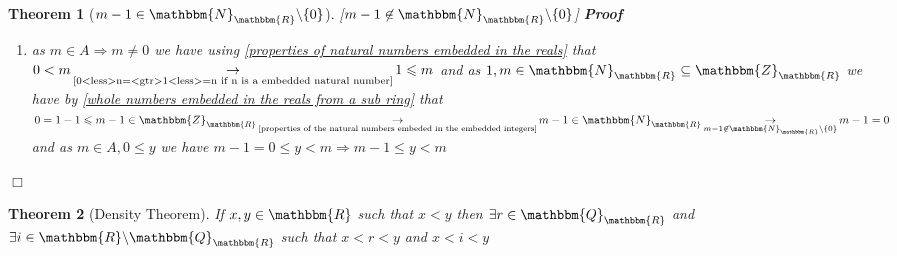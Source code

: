 \documentclass{book}
\newcommand{\Rightarrowlim}{\mathop{\rightarrow}\limits}
\newcommand{\nin}{\not\in}
\newcommand{\um}{-}
\newenvironment{proof}{\noindent\textbf{Proof\ }}{\hspace*{\fill}$\Box$\medskip}
\newtheorem{theorem}{Theorem}
\begin{document}
{{\begin{theorem}[$m \um 1 \in \mathbbm{N}_{\mathbbm{R}} \backslash \{ 0 \}$][$m
\um 1 \nin \mathbbm{N}_{\mathbbm{R}} \backslash \{ 0 \}$]
\begin{proof}
\begin{enumerate}
\begin{enumerate}
        \item as $m \in A \Rightarrow m \neq 0$ we have using \ref{properties
        of natural numbers embedded in the reals} that $0 < m
        \Rightarrowlim_{\text{\ref{0<less>n=<gtr>1<less>=n if n is a embedded
        natural number}}} 1 \leqslant m$ and as $1, m \in
        \mathbbm{N}_{\mathbbm{R}} \subseteq \mathbbm{Z}_{\mathbbm{R}}$ we have
        by \ref{whole numbers embedded in the reals from a sub ring} that $0 =
        1 \um 1 \leqslant m \um 1 \in \mathbbm{Z}_{\mathbbm{R}}
        \Rightarrowlim_{\text{\ref{properties of the natural numbers embeded
        in the embedded integers}}} m \um 1 \in \mathbbm{N}_{\mathbbm{R}}
        \Rightarrowlim_{m \um 1 \nin \mathbbm{N}_{\mathbbm{R}} \backslash \{ 0
        \}} m \um 1 = 0$ and as $m \in A, 0 \leqslant y$ we have $m \um 1 = 0
        \leqslant y < m \Rightarrow m - 1 \leqslant y < m$
      \end{enumerate}
    \end{enumerate}
  \end{proof}
\end{theorem}

\begin{theorem}[Density Theorem]
  \label{density theorem for the reals}{}If $x, y \in
  \mathbbm{R}$ such that $x < y$ then $\exists r \in
  \mathbbm{Q}_{\mathbbm{R}}$ and $\exists i \in \mathbbm{R} \backslash
  \mathbbm{Q}_{\mathbbm{R}}$ such that $x < r < y$ and $x < i < y$
\end{theorem}

}}
\end{document}
